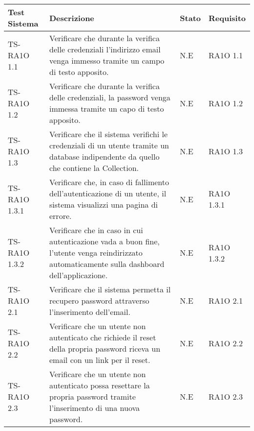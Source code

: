 

  \begin{center}
  \def\arraystretch{1.5}
  \bgroup
    \begin{longtable}{| p{3cm} | p{6cm} | p{1.5cm} | p{2cm} | }
    \hline 
     \textbf{Test Sistema} & \textbf{Descrizione} & \textbf{Stato} & \textbf{Requisito} \\ \hline
        TS-RA1O 1.1 & 
        Verificare che durante la verifica delle credenziali l'indirizzo email venga immesso tramite un campo di testo apposito. & N.E &       
            RA1O 1.1 \newline  \\ \hline 
        TS-RA1O 1.2 & 
        Verificare che durante la verifica delle credenziali, la password venga immessa tramite un capo di testo apposito.
 & N.E &       
            RA1O 1.2 \newline  \\ \hline 
        TS-RA1O 1.3 & 
        Verificare che il sistema verifichi le credenziali di un utente tramite un database indipendente da quello che contiene la Collection. & N.E &       
            RA1O 1.3 \newline  \\ \hline 
        TS-RA1O 1.3.1 & 
        Verificare che, in caso di fallimento dell'autenticazione di un utente, il sistema visualizzi una pagina di errore. & N.E &       
            RA1O 1.3.1 \newline  \\ \hline 
        TS-RA1O 1.3.2 & 
        Verificare che in caso in cui autenticazione vada a buon fine, l'utente venga reindirizzato automaticamente sulla dashboard dell'applicazione.  & N.E &       
            RA1O 1.3.2 \newline  \\ \hline 
        TS-RA1O 2.1 & 
        Verificare che il sistema permetta il recupero password attraverso l'inserimento dell'email.
 & N.E &       
            RA1O 2.1 \newline  \\ \hline 
        TS-RA1O 2.2 & 
        Verificare che un utente non autenticato che richiede il reset della propria password riceva un email con un link per il reset. & N.E &       
            RA1O 2.2 \newline  \\ \hline 
        TS-RA1O 2.3 & 
        Verificare che un utente non autenticato possa resettare la propria password tramite l'inserimento di una nuova password.
 & N.E &       
            RA1O 2.3 \newline  \\ \hline 

\end{longtable}
\end{center}
